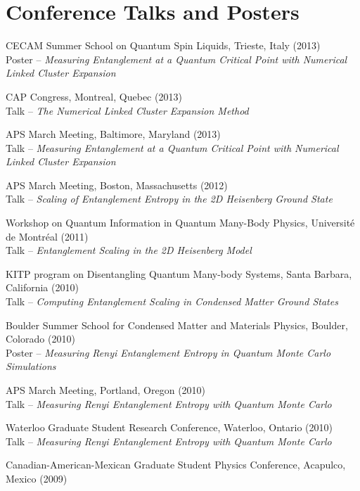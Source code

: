 \documentclass[letterpaper]{article}
\renewenvironment{itemize}{
  \begin{list}{}{
    \setlength{\leftmargin}{1.5em}
  }
}{
  \end{list}
}
\begin{document}
\section*{Conference Talks and Posters}

\begin{itemize}
\item CECAM Summer School on Quantum Spin Liquids, Trieste, Italy (2013) \\
	Poster --  {\it Measuring Entanglement at a Quantum Critical Point with Numerical Linked Cluster Expansion}
\item CAP Congress, Montreal, Quebec (2013) \\
	Talk --  {\it The Numerical Linked Cluster Expansion Method}
\item APS March Meeting, Baltimore, Maryland (2013) \\
	Talk --  {\it Measuring Entanglement at a Quantum Critical Point with Numerical Linked Cluster Expansion}
\item APS March Meeting, Boston, Massachusetts (2012) \\
	Talk --  {\it Scaling of Entanglement Entropy in the 2D Heisenberg Ground State}
\item Workshop on Quantum Information in Quantum Many-Body Physics, Universit\'e de Montr\'eal  (2011) \\ Talk --  {\it Entanglement Scaling in the 2D Heisenberg Model}
\item KITP program on Disentangling Quantum Many-body Systems, Santa Barbara, California (2010) \\
 	Talk -- {\it Computing Entanglement Scaling in Condensed Matter Ground States}
\item Boulder Summer School for Condensed Matter and Materials Physics, Boulder, Colorado (2010)\\
	Poster -- {\it Measuring Renyi Entanglement Entropy in Quantum Monte Carlo Simulations}
\item APS March Meeting, Portland, Oregon (2010) \\
	Talk --  {\it Measuring Renyi Entanglement Entropy with Quantum Monte Carlo}
\item Waterloo Graduate Student Research Conference, Waterloo, Ontario (2010) \\
	Talk --  {\it Measuring Renyi Entanglement Entropy with Quantum Monte Carlo}
\item Canadian-American-Mexican Graduate Student Physics Conference, Acapulco, Mexico (2009) \\

\end{itemize}
\end{document}
